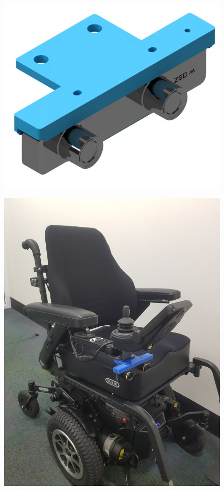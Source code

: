 \begin{figure}[b]
    \centering
    \begin{minipage}[b]{.4\textwidth}
      \centering
      \captionsetup{width=.8\textwidth}
      \includegraphics[width=\linewidth]{images/zed_mount.png}
        \label{fig:zed_mount}
    \end{minipage}%
    \begin{minipage}[b]{.48\textwidth}
        \centering
        \captionsetup{width=.8\textwidth}
        \includegraphics[height=\linewidth,angle=270,origin=c]{images/wheelchair_zed_1.jpg}
        \label{fig:wheelchair_zed_1}
    \end{minipage}
\end{figure}

